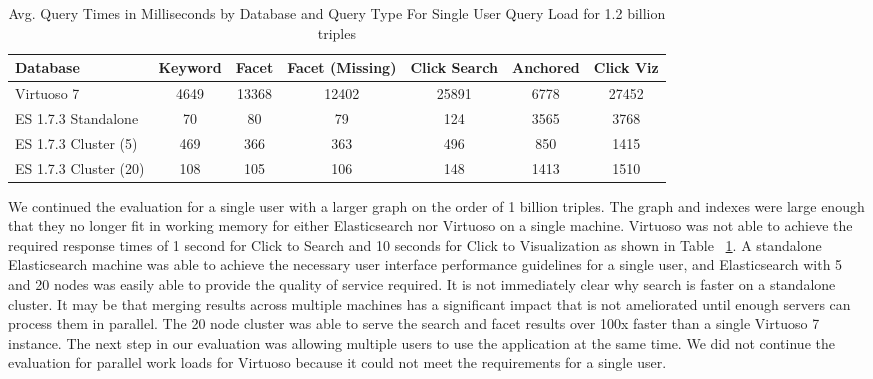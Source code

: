 \begin{table} 
\centering
\footnotesize{
    \begin{tabular}{ l||c|c|c|c|c|c }
        Database & Keyword & Facet & Facet (Missing) & Click Search & Anchored & Click Viz \\ \hline
        Virtuoso 7 & 4649 & 13368 & 12402 & 25891 & 6778 &  27452 \\ 
        ES 1.7.3 Standalone & 70 & 80 & 79 & 124 & 3565 & 3768 \\ 
        ES 1.7.3 Cluster (5) & 469 & 366 & 363 & 496 & 850 & 1415 \\ 
        ES 1.7.3 Cluster (20) & 108 & 105 & 106 & 148 & 1413 & 1510 \\ 
    \end{tabular} 
    }
    \caption{Avg. Query Times in Milliseconds by Database and Query Type For Single User Query Load for 1.2 billion triples}
    \label{table:qt_single_user_1b}
\end{table}

We continued the evaluation for a single user with a larger graph on the order of 1 billion triples.  
The graph and indexes were large enough that they no longer fit in working memory for either Elasticsearch nor Virtuoso on a single machine.
Virtuoso was not able to achieve the required response times of 1 second for Click to Search and 10 seconds for Click to Visualization as shown in Table ~\ref{table:qt_single_user_1b}.
A standalone Elasticsearch machine was able to achieve the necessary user interface performance guidelines for a single user, and Elasticsearch with 5 and 20 nodes was easily able to provide the quality of service required.
It is not immediately clear why search is faster on a standalone cluster.
It may be that merging results across multiple machines has a significant impact that is not ameliorated until enough servers can process them in parallel. 
The 20 node cluster was able to serve the search and facet results over 100x faster than a single Virtuoso 7 instance. 
The next step in our evaluation was allowing multiple users to use the application at the same time.
We did not continue the evaluation for parallel work loads for Virtuoso because it could not meet the requirements for a single user.

